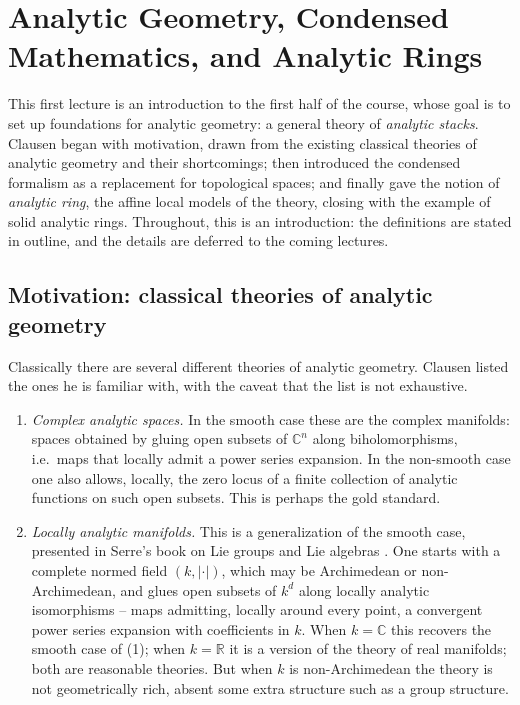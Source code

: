 \section{Analytic Geometry, Condensed Mathematics, and Analytic Rings}
\label{lec:1}

This first lecture is an introduction to the first half of the course, whose
goal is to set up foundations for analytic geometry: a general theory of
\emph{analytic stacks}. Clausen began with motivation, drawn from the existing
classical theories of analytic geometry and their shortcomings; then introduced
the condensed formalism as a replacement for topological spaces; and finally
gave the notion of \emph{analytic ring}, the affine local models of the theory,
closing with the example of solid analytic rings. Throughout, this is an
introduction: the definitions are stated in outline, and the details are
deferred to the coming lectures.

\subsection{Motivation: classical theories of analytic geometry}

Classically there are several different theories of analytic geometry. Clausen
listed the ones he is familiar with, with the caveat that the list is not
exhaustive.

\begin{enumerate}
\item \emph{Complex analytic spaces.} In the smooth case these are the complex
manifolds: spaces obtained by gluing open subsets of $\mathbb{C}^n$ along
biholomorphisms, i.e.\ maps that locally admit a power series expansion. In the
non-smooth case one also allows, locally, the zero locus of a finite collection
of analytic functions on such open subsets. This is perhaps the gold standard.

\item \emph{Locally analytic manifolds.} This is a generalization of the smooth
case, presented in Serre's book on Lie groups and Lie algebras
\cite{Serre_1992}. One starts with a complete normed field $(k,\lvert\cdot\rvert)$,
which may be Archimedean or non-Archimedean, and glues open subsets of $k^d$
along locally analytic isomorphisms -- maps admitting, locally around every
point, a convergent power series expansion with coefficients in $k$. When
$k=\mathbb{C}$ this recovers the smooth case of (1); when $k=\mathbb{R}$ it is a
version of the theory of real manifolds; both are reasonable theories. But when
$k$ is non-Archimedean the theory is not geometrically rich, absent some extra
structure such as a group structure.
\end{enumerate}


